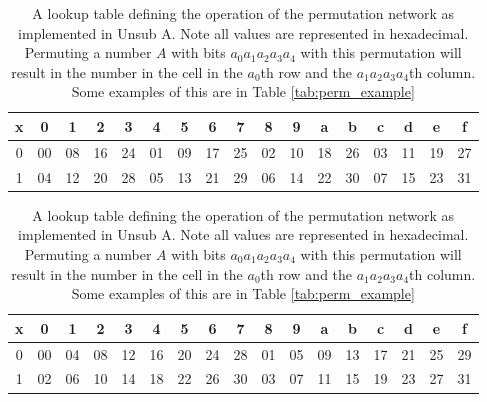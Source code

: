 \documentclass[12pt,a4paper]{article}
\begin{document}
\begin{table}[P]
\centering
\begin{subtable}[b]{\textwidth}
    \centering
    \begin{tabular}{|c||c|c|c|c|c|c|c|c|c|c|c|c|c|c|c|c|} 
    \hline
    x  & 0 & 1 & 2 & 3 & 4 & 5 & 6 & 7 & 8 & 9 & a & b & c & d & e & f  \\
    \hline \hline
    0 & 00 &  08 & 16 & 24 & 01 &  09 & 17 & 25 &  02 & 10 & 18 & 26 & 03 & 11 & 19 & 27 \\ \hline
    1 & 04 & 12 & 20 & 28 & 05 & 13 & 21 & 29 & 06 & 14 & 22 & 30 & 07 & 15 & 23 & 31 \\ \hline
    \end{tabular}
    \caption{Permutation}
    \label{tab:perm}
\end{subtable}
\begin{subtable}[b]{\textwidth}
    \centering
    \begin{tabular}{|c||c|c|c|c|c|c|c|c|c|c|c|c|c|c|c|c|} 
    \hline
    x  & 0 & 1 & 2 & 3 & 4 & 5 & 6 & 7 & 8 & 9 & a & b & c & d & e & f  \\
    \hline \hline
    0 &  00 & 04 & 08 & 12 & 16 & 20 & 24 & 28 & 01 & 05 & 09 & 13 & 17 & 21 & 25 & 29 \\ \hline
    1 &  02 & 06 & 10 & 14 & 18 & 22 & 26 & 30 & 03 & 07 & 11 & 15 & 19 & 23 & 27 & 31 \\ \hline
    \end{tabular}
    \caption{Inverse Permutation}
    \label{tab:inv_perm}
\end{subtable}
\caption[Permutation Layer Definition for UnsubA]{A lookup table defining the operation of the permutation network
as implemented in Unsub A. Note all values are represented in hexadecimal. 
Permuting a number $A$ with bits $a_0a_1a_2a_3a_4$ with this
permutation will result in the number in the cell in the $a_0$th row and the
$a_1a_2a_3a_4$th column. Some examples of this are in Table
\ref{tab:perm_example}}
\end{table}
\end{document}
